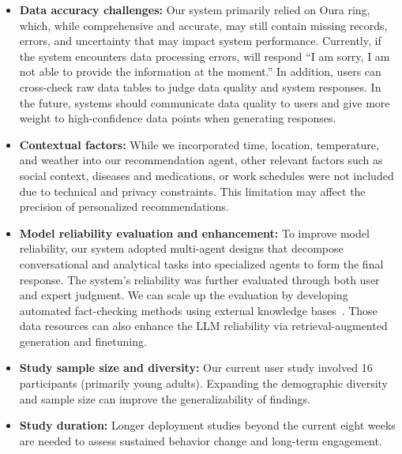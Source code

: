 \begin{itemize}
    \item \textbf{Data accuracy challenges:} Our system primarily relied on Oura ring, which, while comprehensive and accurate, may still contain 
    missing records, errors, and uncertainty that may impact system performance. Currently, if the system encounters data processing errors, \name{} will respond ``I am sorry, I am not able to provide the information at the moment.'' In addition, users can cross-check raw data tables to judge data quality and system responses. In the future, systems should communicate data quality to users and give more weight to high-confidence data points when generating responses.
    \item \textbf{Contextual factors:} While we incorporated time, location, temperature, and weather into our recommendation agent, other relevant factors such as social context, diseases and medications, or work schedules were not included due to technical and privacy constraints. This limitation may affect the precision of personalized recommendations. 
    \item \textbf{Model reliability evaluation and enhancement:} To improve model reliability, our system adopted multi-agent designs that decompose conversational and analytical tasks into specialized agents to form the final response. The system's reliability was further evaluated through both user and expert judgment. We can scale up the evaluation by
    developing automated fact-checking methods using external knowledge bases~\cite{kotonya-toni-2020-explainable-automated,sarrouti-etal-2021-evidence-based}. Those data resources can also enhance the LLM reliability via retrieval-augmented generation and finetuning.
    \item \textbf{Study sample size and diversity:} Our current user study involved 16 participants (primarily young adults). Expanding the demographic diversity and sample size can improve the generalizability of findings.
    \item \textbf{Study duration:} Longer deployment studies beyond the current eight weeks are needed to assess sustained behavior change and long-term engagement.

\end{itemize}


